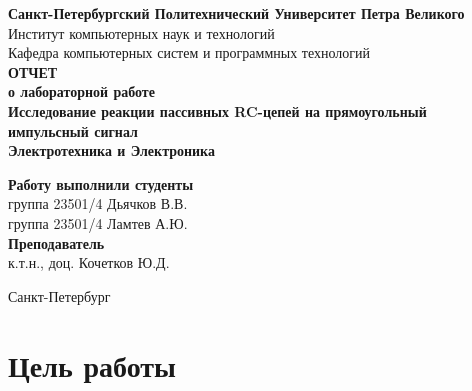 \documentclass[a4paper,14pt]{extarticle}
\newcommand{\sign}[1][5cm]{\makebox[#1]{\hrulefill}} %
\begin{document}
\begin{titlepage}
	\begin{center}
		\textbf{Санкт-Петербургский Политехнический Университет Петра Великого}\\[0.3cm]
		\small Институт компьютерных наук и технологий \\[0.3cm]
		\small Кафедра компьютерных систем и программных технологий\\[4cm]
		
		\textbf{ОТЧЕТ}\\ \textbf{о лабораторной работе}\\[0.5cm]
		\textbf{Исследование реакции пассивных RC-цепей на прямоугольный \\импульсный сигнал}\\[0.1cm]
		\textbf{Электротехника и Электроника}\\[10cm]
	\end{center}
	
	\begin{flushright}
		\begin{minipage}{0.60\textwidth}
			\begin{flushleft}
				\small \textbf{Работу выполнили студенты}\\[3mm]
				\small группа 23501/4 \hspace*{17mm} Дьячков В.В.\\[3mm]
				\small группа 23501/4 \hspace*{17mm} Ламтев А.Ю.\\[5mm]
				
				\small \textbf{Преподаватель}\\[5mm]
			 	\small \sign[3.5cm] \hspace*{8mm} к.т.н., доц. Кочетков Ю.Д.\\[0.5cm]
			\end{flushleft}
		\end{minipage}
	\end{flushright}
	
	\vfill
	
	\begin{center}
		\small Санкт-Петербург\\
		\small \the\year
	\end{center}
\end{titlepage}

\section{Цель работы}
\end{document}

